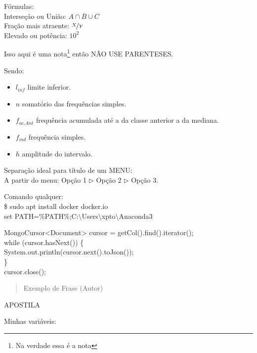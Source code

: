 \documentclass[a4paper,11pt]{article}
\begin{document}
Fórmulas: \\
Interseção ou União: $A \cap B \cup C$ \\
Fração mais atraente: $\nicefrac{X}{Y}$ \\
Elevado ou potência: $10^2$

Isso aqui é uma nota\footnote{Na verdade essa é a nota} então NÃO USE PARENTESES.

Sendo: \vspace{-1em}
\begin{itemize}[nolistsep]
	\item $l_{inf}$ limite inferior.
	\item $n$ somatório das frequências simples.
	\item $f_{ac.Ant}$ frequência acumulada até a da classe anterior a da mediana.
	\item $f_{md}$ frequência simples.
	\item $h$ amplitude do intervalo.
\end{itemize}

Separação ideal para título de um MENU: \\
A partir do menu: Opção 1 $\triangleright$ Opção 2 $\triangleright$ Opção 3.

Comando qualquer: \\
{\ttfamily\$ sudo apt install docker docker.io} \\
{\ttfamily set PATH=\%PATH\%;C:$\setminus$Users$\setminus$xpto$\setminus$Anaconda3}

{\ttfamily MongoCursor<Document> cursor = getCol().find().iterator(); \\
	while (cursor.hasNext()) \{ \\
	\phantom{x}\hspace{4pt} System.out.println(cursor.next().toJson()); \\
	\} \\
	cursor.close(); }

\begin{quotation}
	Exemplo de Frase (Autor)
\end{quotation}

APOSTILA

\begin{theo}[]{}
	\lipsum[4-1]
\end{theo}

\begin{theo}{}
	\lipsum[4-1]
\end{theo}

Minhas variáveis:
\end{document}
